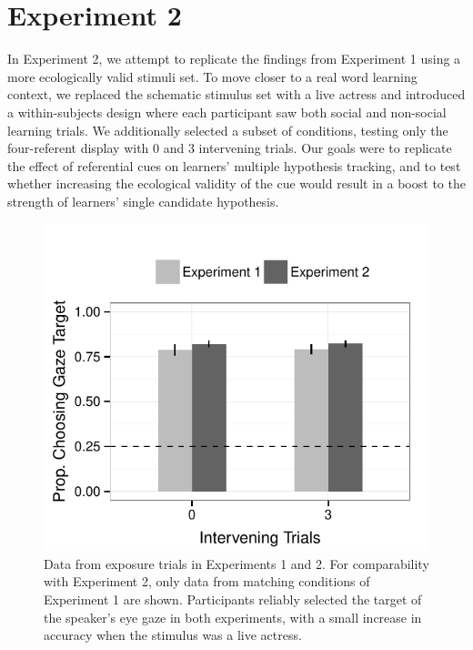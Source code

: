 \documentclass[10pt,letterpaper]{article}
\begin{document}

\section{Experiment 2}

In Experiment 2, we attempt to replicate the findings from Experiment 1 using a more ecologically valid stimuli set. To move closer to a real word learning context, we replaced the schematic stimulus set with a live actress and introduced a within-subjects design where each participant saw both social and non-social learning trials. We additionally selected a subset of conditions, testing only the four-referent display with 0 and 3 intervening trials. Our goals were to replicate the effect of referential cues on learners' multiple hypothesis tracking, and to test whether increasing the ecological validity of the cue would result in a boost to the strength of learners' single candidate hypothesis.  

\begin{figure}[t!]
\begin{center}
\includegraphics[scale=0.4]{plots_figs/acc-expo-expt1_2}
\end{center}
\caption{Data from exposure trials in Experiments 1 and 2. For comparability with Experiment 2, only data from matching conditions of Experiment 1 are shown. Participants reliably selected the target of the speaker's eye gaze in both experiments, with a small increase in accuracy when the stimulus was a live actress.}
\end{figure}
\end{document}
